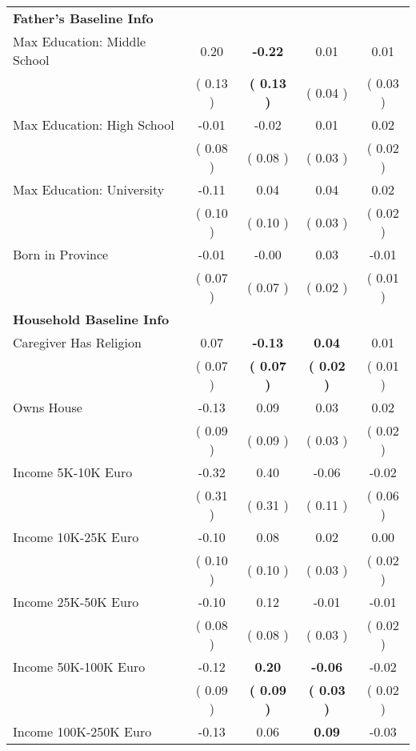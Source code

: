 \begin{table}[H]
{\begin{tabular}{lcccc}
\midrule
\textbf{Father's Baseline Info} \\
\quad Max Education: Middle School &      0.20 & \textbf{    -0.22} &      0.01 &      0.01 \\
\quad  & (     0.13 ) & \textbf{(     0.13 )}  & (     0.04 )  & (     0.03 )  \\
\quad Max Education: High School &     -0.01 &     -0.02 &      0.01 &      0.02 \\
\quad  & (     0.08 ) & (     0.08 )  & (     0.03 )  & (     0.02 )  \\
\quad Max Education: University &     -0.11 &      0.04 &      0.04 &      0.02 \\
\quad  & (     0.10 ) & (     0.10 )  & (     0.03 )  & (     0.02 )  \\
\quad Born in Province &     -0.01 &     -0.00 &      0.03 &     -0.01 \\
\quad  & (     0.07 ) & (     0.07 )  & (     0.02 )  & (     0.01 )  \\
\midrule
\textbf{Household Baseline Info} \\
\quad Caregiver Has Religion &      0.07 & \textbf{    -0.13} & \textbf{     0.04} &      0.01 \\
\quad  & (     0.07 ) & \textbf{(     0.07 )}  & \textbf{(     0.02 )}  & (     0.01 )  \\
\quad Owns House &     -0.13 &      0.09 &      0.03 &      0.02 \\
\quad  & (     0.09 ) & (     0.09 )  & (     0.03 )  & (     0.02 )  \\
\quad Income 5K-10K Euro &     -0.32 &      0.40 &     -0.06 &     -0.02 \\
\quad  & (     0.31 ) & (     0.31 )  & (     0.11 )  & (     0.06 )  \\
\quad Income 10K-25K Euro &     -0.10 &      0.08 &      0.02 &      0.00 \\
\quad  & (     0.10 ) & (     0.10 )  & (     0.03 )  & (     0.02 )  \\
\quad Income 25K-50K Euro &     -0.10 &      0.12 &     -0.01 &     -0.01 \\
\quad  & (     0.08 ) & (     0.08 )  & (     0.03 )  & (     0.02 )  \\
\quad Income 50K-100K Euro &     -0.12 & \textbf{     0.20} & \textbf{    -0.06} &     -0.02 \\
\quad  & (     0.09 ) & \textbf{(     0.09 )}  & \textbf{(     0.03 )}  & (     0.02 )  \\
\quad Income 100K-250K Euro &     -0.13 &      0.06 & \textbf{     0.09} &     -0.03 \\

\end{tabular}}
\end{table}
